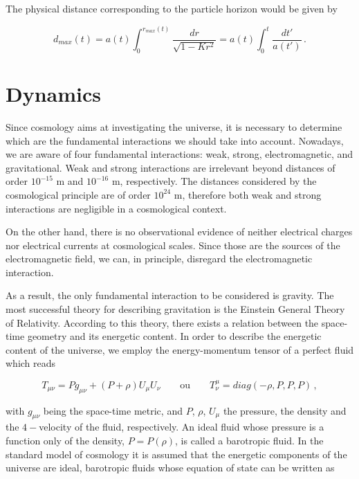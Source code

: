 The physical distance corresponding to the particle horizon would be given by 

\begin{equation}
d_{max}(t) = a(t) \int_0^{r_{max}(t)} \frac{dr}{\sqrt{1-K r^2}} = a(t) \int_0^t \frac{dt'}{a(t')} \, .
\label{equation:1.2.15}
\end{equation} 


\section{Dynamics}
\label{section:1.3}

Since cosmology aims at investigating the universe, it is necessary to determine which are the fundamental interactions we should take into account. Nowadays, we are aware of four fundamental interactions: weak, strong, electromagnetic, and gravitational. Weak and strong interactions are irrelevant beyond distances of order $ 10^{-15} $ m and $ 10^{-16} $ m, respectively. The distances considered by the cosmological principle are of order $ 10^{24} $ m, therefore both weak and strong interactions are negligible in a cosmological context. 

On the other hand, there is no observational evidence of neither electrical charges nor electrical currents at cosmological scales. Since those are the sources of the electromagnetic field, we can, in principle, disregard the electromagnetic interaction. 

As a result, the only fundamental interaction to be considered is gravity. The most successful theory for describing gravitation is the Einstein General Theory of Relativity. According to this theory, there exists a relation between the space-time geometry and its energetic content. In order to describe the energetic content of the universe, we employ the energy-momentum tensor of a perfect fluid which reads 

\begin{equation}
T_{\mu\nu}=P g_{\mu\nu} + (P+\rho)U_{\mu}U_{\nu}  \qquad \text{ou} \qquad  T^{\mu}_{\nu}=diag(-\rho, P, P, P) \, ,
\label{equation:1.3.1}
\end{equation}        

with $ g_{\mu\nu} $ being the space-time metric, and $ P $, $ \rho $, $ U_{\mu} $ the pressure, the density and the $ 4- $velocity of the fluid, respectively. An ideal fluid whose pressure is a function only of the density, $ P=P(\rho) $, is called a barotropic fluid. In the standard model of cosmology it is assumed that the energetic components of the universe are ideal, barotropic fluids whose equation of state can be written as

